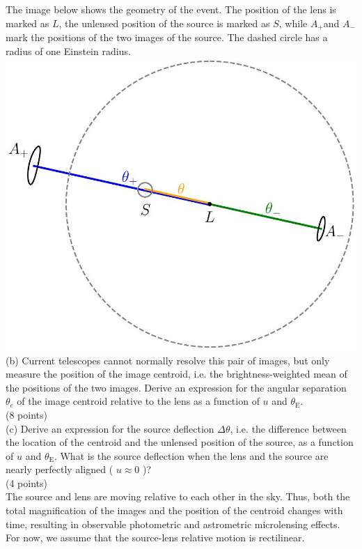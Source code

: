 \documentclass[10pt]{article}
\begin{document}
The image below shows the geometry of the event. The position of the lens is marked as $L$, the unlensed position of the source is marked as $S$, while $A_{+}$and $A_{-}$mark the positions of the two images of the source. The dashed circle has a radius of one Einstein radius.\\
\includegraphics[max width=\textwidth, center]{2025_09_11_2a6858dd99d789184a35g-06}\\
(b) Current telescopes cannot normally resolve this pair of images, but only measure the position of the image centroid, i.e. the brightness-weighted mean of the positions of the two images. Derive an expression for the angular separation $\theta_{c}$ of the image centroid relative to the lens as a function of $u$ and $\theta_{\mathrm{E}}$.\\
(8 points)\\
(c) Derive an expression for the source deflection $\Delta \theta$, i.e. the difference between the location of the centroid and the unlensed position of the source, as a function of $u$ and $\theta_{\mathrm{E}}$. What is the source deflection when the lens and the source are nearly perfectly aligned ( $u \approx 0$ )?\\
(4 points)\\
The source and lens are moving relative to each other in the sky. Thus, both the total magnification of the images and the position of the centroid changes with time, resulting in observable photometric and astrometric microlensing effects. For now, we assume that the source-lens relative motion is rectilinear.
\end{document}

